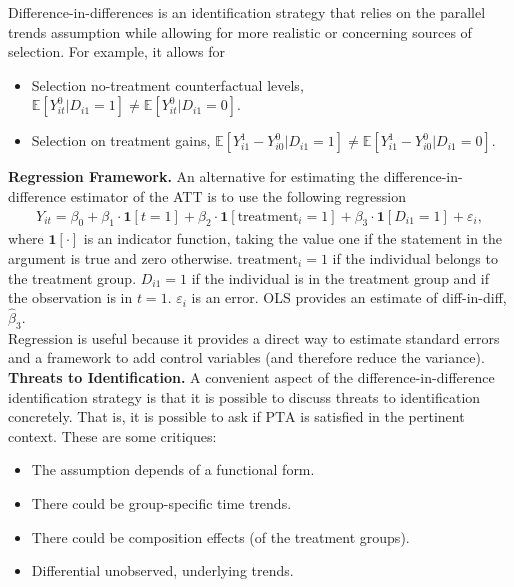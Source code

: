 \noindent Difference-in-differences is an identification strategy that relies on the parallel trends assumption while allowing for more realistic or concerning sources of selection. For example, it allows for 
\begin{itemize}
\item Selection no-treatment counterfactual levels, $\mathbb{E}  \left[  Y_{it}^0 | D_{i1} = 1\right]  \neq \mathbb{E}  \left[  Y_{it}^0 | D_{i1} = 0 \right]$.  
\item Selection on treatment gains, $\mathbb{E}  \left[  Y_{i1}^1 -  Y_{i{0}}^0 | D_{i1} = 1\right] \neq  \mathbb{E}  \left[  Y_{i1}^1 -  Y_{i{0}}^0 | D_{i1} = 0 \right]$.
\end{itemize}
\bigskip
\textbf{Regression Framework.} An alternative for estimating the difference-in-difference estimator of the ATT is to use the following regression
\begin{eqnarray}
Y_{it} = \beta_0 + \beta_1  \cdot \bm{1}\left [ t = 1 \right] + \beta_2  \cdot \bm{1} \left [ \text{treatment}_i = 1\right] + \beta_3  \cdot \bm{1} \left[ D_{i1} = 1\right] + \varepsilon_i, 
\end{eqnarray}
\noindent where $\bm{1} \left [ \cdot \right]$ is an indicator function, taking the value one if the statement in the argument is true and zero otherwise. $\text{treatment}_i = 1$ if the individual belongs to the treatment group. $D_{i1} = 1$ if the individual is in the treatment group and if the observation is in $t = 1$. $\varepsilon_i$ is an error. OLS provides an estimate of diff-in-diff, $\hat{\beta}_3$. \\

\noindent Regression is useful because it provides a direct way to estimate standard errors and a framework to add control variables (and therefore reduce the variance).\\

\noindent \textbf{Threats to Identification.} A convenient aspect of the difference-in-difference identification strategy is that it is possible to discuss threats to identification concretely. That is, it is possible to ask if $\text{PTA}$ is satisfied in the pertinent context. These are some critiques: 
\begin{itemize} 
\item The assumption depends of a functional form. 
\item There could be group-specific time trends. 
\item There could be composition effects (of the treatment groups).
\item Differential unobserved, underlying trends.
\end{itemize}

